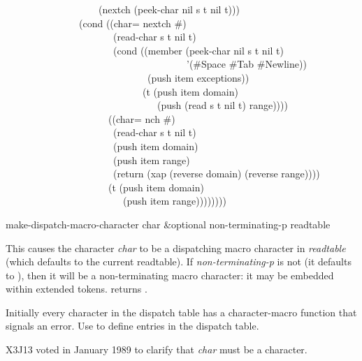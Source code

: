 \begin{table}
\begin{new}
\begin{lisp}
~~~~~~~~~~~~~~~~~~~(nextch (peek-char nil s t nil t))) \\
~~~~~~~~~~~~~~~(cond ((char= nextch \#{\Xbackslash}{\Xarrowright}) \\
~~~~~~~~~~~~~~~~~~~~~~(read-char s t nil t) \\
~~~~~~~~~~~~~~~~~~~~~~(cond ((member (peek-char nil s t nil t) \\
~~~~~~~~~~~~~~~~~~~~~~~~~~~~~~~~~~~~~'(\#{\Xbackslash}Space \#{\Xbackslash}Tab \#{\Xbackslash}Newline)) \\
~~~~~~~~~~~~~~~~~~~~~~~~~~~~~(push item exceptions)) \\
~~~~~~~~~~~~~~~~~~~~~~~~~~~~(t (push item domain) \\
~~~~~~~~~~~~~~~~~~~~~~~~~~~~~~~(push (read s t nil t) range)))) \\
~~~~~~~~~~~~~~~~~~~~~((char= nch \#{\Xbackslash}{\Xrbrace}) \\
~~~~~~~~~~~~~~~~~~~~~~(read-char s t nil t) \\
~~~~~~~~~~~~~~~~~~~~~~(push item domain) \\
~~~~~~~~~~~~~~~~~~~~~~(push item range) \\
~~~~~~~~~~~~~~~~~~~~~~(return (xap (reverse domain) (reverse range)))) \\
~~~~~~~~~~~~~~~~~~~~~(t (push item domain) \\
~~~~~~~~~~~~~~~~~~~~~~~~(push item range))))))))
\end{lisp}
\end{new}
\end{table}

\begin{defun}[Function]
make-dispatch-macro-character char &optional non-terminating-p readtable

This causes the character \emph{char} to be a dispatching macro character
in \emph{readtable} (which defaults to the current readtable).
If \emph{non-terminating-p} is not {\false} (it defaults to {\false}),
then it will be a non-terminating macro character: it may be embedded
within extended tokens.
 returns {\true}.

Initially every character in the dispatch table has a character-macro
function that signals an error.  Use 
to define entries in the dispatch table.
\begin{new}
X3J13 voted in January 1989
to clarify that \emph{char} must be a character.
\end{new}

\end{defun}

